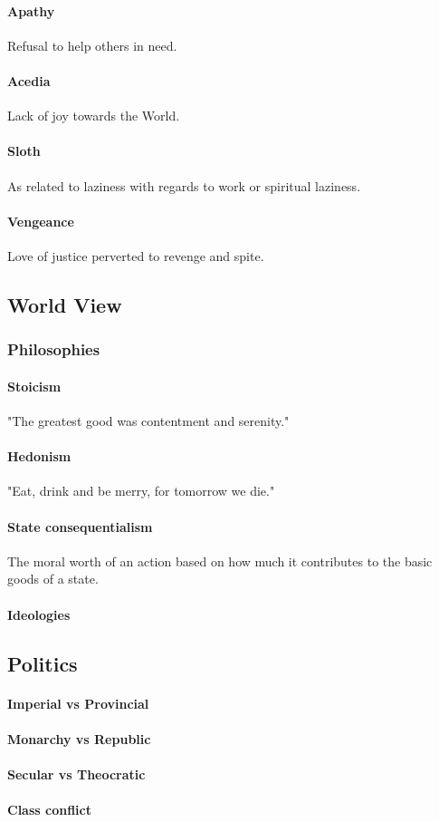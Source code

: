 \begin{multicols}{2}
\paragraph{Apathy} Refusal to help others in need.
\paragraph{Acedia} Lack of joy towards the World.
\paragraph{Sloth} As related to laziness with regards to work or spiritual laziness.
\paragraph{Vengeance} Love of justice perverted to revenge and spite.

\subsection{World View}
\subsubsection{Philosophies}
    \paragraph{Stoicism} "The greatest good was contentment and serenity."
    \paragraph{Hedonism} "Eat, drink and be merry, for tomorrow we die."
    \paragraph{State consequentialism} The moral worth of an action based on how much it contributes to the basic goods of a state.
\paragraph{Ideologies}
\subsection{Politics}
\paragraph{Imperial vs Provincial}
\paragraph{Monarchy vs Republic}
\paragraph{Secular vs Theocratic}
\paragraph{Class conflict}

\end{multicols}